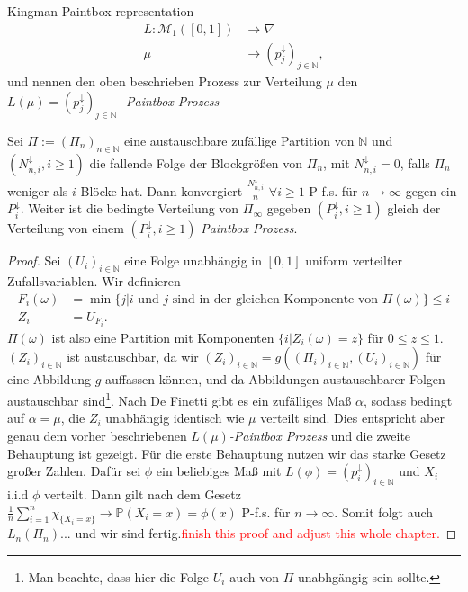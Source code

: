 \begin{section}{Kingman Paintbox representation}
\begin{align*}
L: \mathcal{M}_1([0,1]) &\to \nabla \\
\mu \hspace{20pt} &\to (p_j^\downarrow)_{j \in \mathbb{N}},
\end{align*}
und nennen den oben beschrieben Prozess zur Verteilung $\mu$ den $L(\mu) = (p_j^\downarrow)_{j \in \mathbb{N}}$ \textit{-Paintbox Prozess}
\begin{theorem}
    Sei $\Pi := (\Pi_n)_{n \in \mathbb{N}}$ eine austauschbare zufällige Partition von $\mathbb{N}$ und $(N^{\downarrow}_{n,i}, i \geq 1)$ die fallende Folge der Blockgrößen von $\Pi_n$, mit $N_{n,i}^\downarrow = 0$, falls $\Pi_n$ weniger als $i$ Blöcke hat. Dann konvergiert $\frac{N_{n,i}^\downarrow}{n} $ $ \forall i \geq 1$ P-f.s. für $n \to \infty$ gegen ein $P^\downarrow_i$. Weiter ist die bedingte Verteilung von $\Pi_\infty$ gegeben $(P_i^\downarrow, i \geq 1)$ gleich der Verteilung von einem $(P_i^\downarrow, i \geq 1)$ \textit{Paintbox Prozess}.
\end{theorem}
\begin{proof}
Sei $(U_i)_{i \in \mathbb{N}}$ eine Folge unabhängig in $[0,1]$ uniform verteilter Zufallsvariablen. Wir definieren 
\begin{align*}
F_i(\omega) &= \min{\{j| i \text{ und } j \text{ sind in der gleichen Komponente von }  \Pi(\omega)\}} \leq i \\
Z_i &= U_{F_i}.
\end{align*}
$\Pi(\omega)$ ist also eine Partition mit Komponenten $\{i| Z_i(\omega) = z\}$ für $0 \leq z \leq 1$. $(Z_i)_{i \in \mathbb{N}}$ ist austauschbar, da wir $(Z_i)_{i \in \mathbb{N}} = g((\Pi_i)_{i \in \mathbb{N}},(U_i)_{i \in \mathbb{N}})$ für eine Abbildung $g$ auffassen können, und da Abbildungen austauschbarer Folgen austauschbar sind\footnote{Man beachte, dass hier die Folge $U_i$ auch von $\Pi$ unabhgängig sein sollte.}. Nach De Finetti gibt es ein zufälliges Maß $\alpha$, sodass bedingt auf $\alpha = \mu$, die $Z_i$ unabhängig identisch wie $\mu$ verteilt sind. Dies entspricht aber genau dem vorher beschriebenen $L(\mu)$\textit{-Paintbox Prozess} und die zweite Behauptung ist gezeigt. Für die erste Behauptung nutzen wir das starke Gesetz großer Zahlen. Dafür sei $\phi$ ein beliebiges Maß mit $L(\phi) = (p^\downarrow_i)_{i \in \mathbb{N}}$ und $X_i$ i.i.d $\phi$ verteilt. Dann gilt nach dem Gesetz $\frac{1}{n}\sum_{i=1}^{n}\chi_{\{X_i = x\}} \rightarrow \mathbb{P}(X_i = x) = \phi(x)$ P-f.s. für $n \to \infty$. Somit folgt auch $L_n(\Pi_n)...$ und wir sind fertig.\textcolor{red}{finish this proof and adjust this whole chapter.}
\end{proof}

\end{section}